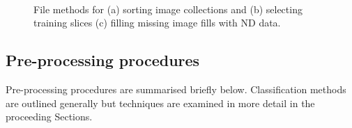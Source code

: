 \begin{figure}[!htbp]\myfloatalign
{} \\
 \\
 \\
\caption[Sorting image collections.]{File methods for (a) sorting image collections and (b) selecting training slices (c) filling missing image fills with ND data.}\label{fig:sortselecttrain}
\end{figure}

\subsection{Pre-processing procedures}\label{sec:pre-processing-procedures}
Pre-processing procedures are summarised briefly below. Classification methods are outlined generally but techniques are examined in more detail in the proceeding Sections.

